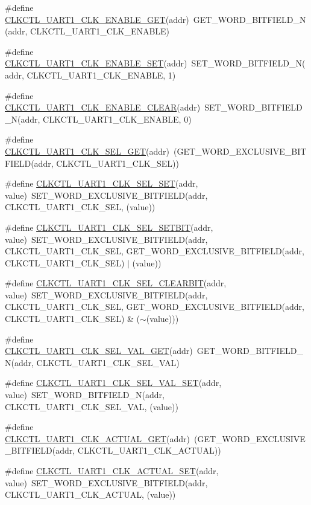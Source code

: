 \begin{DoxyCompactItemize}
\item 
\#define \hyperlink{a00544_a993d5bc281e1d0fc2ad3aca85d64ad4c}{CLKCTL\_\-UART1\_\-CLK\_\-ENABLE\_\-GET}(addr)~GET\_\-WORD\_\-BITFIELD\_\-N(addr, CLKCTL\_\-UART1\_\-CLK\_\-ENABLE)
\item 
\#define \hyperlink{a00544_a48bd663caa06671b7424db06cf1a67c6}{CLKCTL\_\-UART1\_\-CLK\_\-ENABLE\_\-SET}(addr)~SET\_\-WORD\_\-BITFIELD\_\-N(addr, CLKCTL\_\-UART1\_\-CLK\_\-ENABLE, 1)
\item 
\#define \hyperlink{a00544_a1bb28b8618648f79289e2de02ad0d61f}{CLKCTL\_\-UART1\_\-CLK\_\-ENABLE\_\-CLEAR}(addr)~SET\_\-WORD\_\-BITFIELD\_\-N(addr, CLKCTL\_\-UART1\_\-CLK\_\-ENABLE, 0)
\item 
\#define \hyperlink{a00544_af2e58051df21c6e69a549614bf4b79eb}{CLKCTL\_\-UART1\_\-CLK\_\-SEL\_\-GET}(addr)~(GET\_\-WORD\_\-EXCLUSIVE\_\-BITFIELD(addr, CLKCTL\_\-UART1\_\-CLK\_\-SEL))
\item 
\#define \hyperlink{a00544_a51149d7284a4f0acd1ed2dedead1d6df}{CLKCTL\_\-UART1\_\-CLK\_\-SEL\_\-SET}(addr, value)~SET\_\-WORD\_\-EXCLUSIVE\_\-BITFIELD(addr, CLKCTL\_\-UART1\_\-CLK\_\-SEL, (value))
\item 
\#define \hyperlink{a00544_afc81cc1ded8df56a821054cb5350d8b8}{CLKCTL\_\-UART1\_\-CLK\_\-SEL\_\-SETBIT}(addr, value)~SET\_\-WORD\_\-EXCLUSIVE\_\-BITFIELD(addr, CLKCTL\_\-UART1\_\-CLK\_\-SEL, GET\_\-WORD\_\-EXCLUSIVE\_\-BITFIELD(addr, CLKCTL\_\-UART1\_\-CLK\_\-SEL) $|$ (value))
\item 
\#define \hyperlink{a00544_aeddf357fe684d751d4cea6f94607afdf}{CLKCTL\_\-UART1\_\-CLK\_\-SEL\_\-CLEARBIT}(addr, value)~SET\_\-WORD\_\-EXCLUSIVE\_\-BITFIELD(addr, CLKCTL\_\-UART1\_\-CLK\_\-SEL, GET\_\-WORD\_\-EXCLUSIVE\_\-BITFIELD(addr, CLKCTL\_\-UART1\_\-CLK\_\-SEL) \& ($\sim$(value)))
\item 
\#define \hyperlink{a00544_ad5bc216b60c2373855e24e835723cb20}{CLKCTL\_\-UART1\_\-CLK\_\-SEL\_\-VAL\_\-GET}(addr)~GET\_\-WORD\_\-BITFIELD\_\-N(addr, CLKCTL\_\-UART1\_\-CLK\_\-SEL\_\-VAL)
\item 
\#define \hyperlink{a00544_af421f07101c57caa7cc44bd381312686}{CLKCTL\_\-UART1\_\-CLK\_\-SEL\_\-VAL\_\-SET}(addr, value)~SET\_\-WORD\_\-BITFIELD\_\-N(addr, CLKCTL\_\-UART1\_\-CLK\_\-SEL\_\-VAL, (value))
\item 
\#define \hyperlink{a00544_ac6d08dc480a34e0314361a574f7b17b6}{CLKCTL\_\-UART1\_\-CLK\_\-ACTUAL\_\-GET}(addr)~(GET\_\-WORD\_\-EXCLUSIVE\_\-BITFIELD(addr, CLKCTL\_\-UART1\_\-CLK\_\-ACTUAL))
\item 
\#define \hyperlink{a00544_a3febdf10891d7a0de248764d2d93bb41}{CLKCTL\_\-UART1\_\-CLK\_\-ACTUAL\_\-SET}(addr, value)~SET\_\-WORD\_\-EXCLUSIVE\_\-BITFIELD(addr, CLKCTL\_\-UART1\_\-CLK\_\-ACTUAL, (value))

\end{DoxyCompactItemize}
